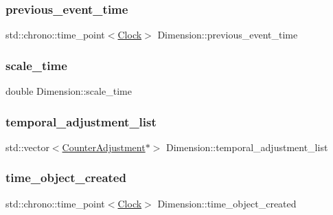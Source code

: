\subsubsection{\texorpdfstring{previous\+\_\+event\+\_\+time}{previous\_event\_time}}
{\footnotesize\ttfamily std\+::chrono\+::time\+\_\+point$<$\mbox{\hyperlink{universe_8h_a0ef8d951d1ca5ab3cfaf7ab4c7a6fd80}{Clock}}$>$ Dimension\+::previous\+\_\+event\+\_\+time\hspace{0.3cm}{\ttfamily [private]}}

\mbox{\label{classDimension_ad3ba9c1c332756658b1e711c447831a3}} 
\subsubsection{\texorpdfstring{scale\+\_\+time}{scale\_time}}
{\footnotesize\ttfamily double Dimension\+::scale\+\_\+time\hspace{0.3cm}{\ttfamily [protected]}}

\mbox{\label{classDimension_a370bb42cca1211c7a6c66846ecec4dd9}} 
\subsubsection{\texorpdfstring{temporal\+\_\+adjustment\+\_\+list}{temporal\_adjustment\_list}}
{\footnotesize\ttfamily std\+::vector$<$\mbox{\hyperlink{structDimension_1_1CounterAdjustment}{Counter\+Adjustment}}$\ast$$>$ Dimension\+::temporal\+\_\+adjustment\+\_\+list}

\mbox{\label{classDimension_a99ba1a7fe44c7e52520144ab4793cad3}} 
\subsubsection{\texorpdfstring{time\+\_\+object\+\_\+created}{time\_object\_created}}
{\footnotesize\ttfamily std\+::chrono\+::time\+\_\+point$<$\mbox{\hyperlink{universe_8h_a0ef8d951d1ca5ab3cfaf7ab4c7a6fd80}{Clock}}$>$ Dimension\+::time\+\_\+object\+\_\+created\hspace{0.3cm}{\ttfamily [protected]}}



